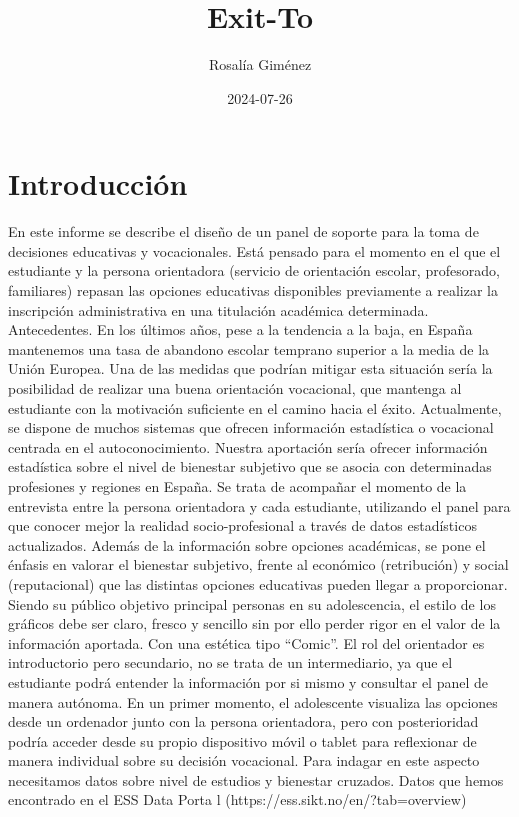 \documentclass{report}
\title{Exit-To}
\author{Rosalía Giménez}
\date{2024-07-26}
\begin{document}


\maketitle

\tableofcontents

\section*{Introducción}
\normalsize
\begin{multicols}{2}
En este informe se describe el diseño de un panel de soporte para la toma de decisiones educativas
y vocacionales. Está pensado para el momento en el que el estudiante y la persona orientadora
(servicio de orientación escolar, profesorado, familiares) repasan las opciones educativas
disponibles previamente a realizar la inscripción administrativa en una titulación académica
determinada.
Antecedentes.
En los últimos años, pese a la tendencia a la baja, en
España mantenemos una tasa de abandono escolar
temprano superior a la media de la Unión Europea.
Una de las medidas que podrían mitigar esta situación
sería la posibilidad de realizar una buena orientación
vocacional, que mantenga al estudiante con la
motivación suficiente en el camino hacia el éxito.
Actualmente, se dispone de muchos sistemas que ofrecen información estadística o vocacional
centrada en el autoconocimiento. Nuestra aportación sería ofrecer información estadística sobre el
nivel de bienestar subjetivo que se asocia con determinadas profesiones y regiones en España.
Se trata de acompañar el momento de la entrevista entre la persona orientadora y cada estudiante,
utilizando el panel para que conocer mejor la realidad socio-profesional a través de datos
estadísticos actualizados.
Además de la información sobre opciones académicas, se pone el énfasis en valorar el bienestar
subjetivo, frente al económico (retribución) y social (reputacional) que las distintas opciones
educativas pueden llegar a proporcionar.
Siendo su público objetivo principal personas en su adolescencia, el estilo de los gráficos debe ser
claro, fresco y sencillo sin por ello perder rigor en el valor de la información aportada. Con una
estética tipo “Comic”.
El rol del orientador es introductorio pero secundario, no se trata de un intermediario, ya que el
estudiante podrá entender la información por si mismo y consultar el panel de manera autónoma.
En un primer momento, el adolescente visualiza las opciones desde un ordenador junto con la
persona orientadora, pero con posterioridad podría acceder desde su propio dispositivo móvil o
tablet para reflexionar de manera individual sobre su decisión vocacional.
Para indagar en este aspecto necesitamos datos sobre nivel de estudios y bienestar cruzados.
Datos que hemos encontrado en el ESS Data Porta l (https://ess.sikt.no/en/?tab=overview)
\end{multicols}
\end{document}
